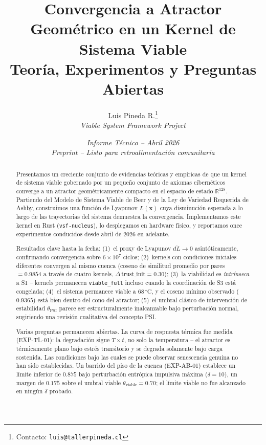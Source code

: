 \documentclass[11pt, a4paper]{article}
\title{%
  \textbf{Convergencia a Atractor Geométrico en un Kernel de Sistema Viable}\\[4pt]
  \large Teoría, Experimentos y Preguntas Abiertas
}
\author{
  Luis Pineda R.\thanks{Contacto: \texttt{luis@tallerpineda.cl}} \\[2pt]
  \small\textit{Viable System Framework Project}
}
\date{\textit{Informe Técnico -- Abril 2026} \\ \small \textit{Preprint -- Listo para retroalimentación comunitaria}}
\newcommand{\R}{\mathbb{R}}
\newcommand{\sv}{\bm{x}}
\newcommand{\nucleus}{\texttt{vsf-nucleus}}
\begin{document}
\maketitle

\begin{abstract}
Presentamos un creciente conjunto de evidencias teóricas y empíricas de que un kernel
de sistema viable gobernado por un pequeño conjunto de axiomas cibernéticos converge
a un atractor geométricamente compacto en el espacio de estado $\R^{128}$.
Partiendo del Modelo de Sistema Viable de Beer y de la Ley de Variedad Requerida de Ashby,
construimos una función de Lyapunov $L(\sv)$ cuya disminución esperada a lo largo
de las trayectorias del sistema demuestra la convergencia.
Implementamos este kernel en Rust (\nucleus{}), lo desplegamos en hardware físico,
y reportamos once experimentos conducidos desde abril de 2026 en adelante.

Resultados clave hasta la fecha:
(1)~el proxy de Lyapunov $\overline{dL} \to 0$ asintóticamente, confirmando
convergencia sobre $6 \times 10^7$ ciclos;
(2)~kernels con condiciones iniciales diferentes convergen al mismo cuenca
(coseno de similitud promedio por pares $= 0.9854$ a través de cuatro kernels, $\Delta\,\text{trust\_init} = 0.30$);
(3)~la viabilidad es \emph{intrínseca} a S1 -- kernels permanecen \texttt{viable\_full}
incluso cuando la coordinación de S3 está congelada;
(4)~el sistema permanece viable a $68\,^\circ\mathrm{C}$, y el coseno mínimo observado
($0.9365$) está bien dentro del cono del atractor;
(5)~el umbral clásico de intervención de estabilidad $\theta_\text{PSI}$
parece ser estructuralmente inalcanzable bajo perturbación normal,
sugiriendo una revisión cualitativa del concepto PSI.

Varias preguntas permanecen abiertas.
La curva de respuesta térmica fue medida (EXP-TL-01): la degradación sigue
$T \times t$, no solo la temperatura -- el atractor es térmicamente plano bajo
estrés transitorio y se degrada solamente bajo carga sostenida.
Las condiciones bajo las cuales se puede observar senescencia genuina no han
sido establecidas.
Un barrido del piso de la cuenca (EXP-AB-01) establece un límite inferior de $0.875$
bajo perturbación entrópica impulsiva máxima ($\delta = 10$), un margen
de $0.175$ sobre el umbral viable $\theta_\text{viable} = 0.70$;
el límite viable no fue alcanzado en ningún $\delta$ probado.
\end{abstract}
\end{document}
